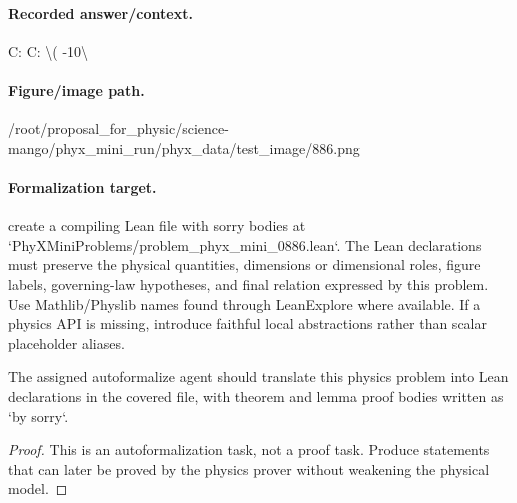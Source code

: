 \paragraph{Recorded answer/context.}
C: C: \textbackslash{}( -10\textbackslash{}

\paragraph{Figure/image path.}
/root/proposal\_for\_physic/science-mango/phyx\_mini\_run/phyx\_data/test\_image/886.png

\paragraph{Formalization target.}
create a compiling Lean file with sorry bodies at `PhyXMiniProblems/problem\_phyx\_mini\_0886.lean`. The Lean declarations must preserve the physical quantities, dimensions or dimensional roles, figure labels, governing-law hypotheses, and final relation expressed by this problem.
Use Mathlib/Physlib names found through LeanExplore where available. If a physics API is missing, introduce faithful local abstractions rather than scalar placeholder aliases.

\begin{theorem}
\label{thm:physics:phyx_mini_0886:target}
The assigned autoformalize agent should translate this physics problem into Lean declarations in the covered file, with theorem and lemma proof bodies written as `by sorry`.
\end{theorem}
\begin{proof}
This is an autoformalization task, not a proof task. Produce statements that can later be proved by the physics prover without weakening the physical model.
\end{proof}

